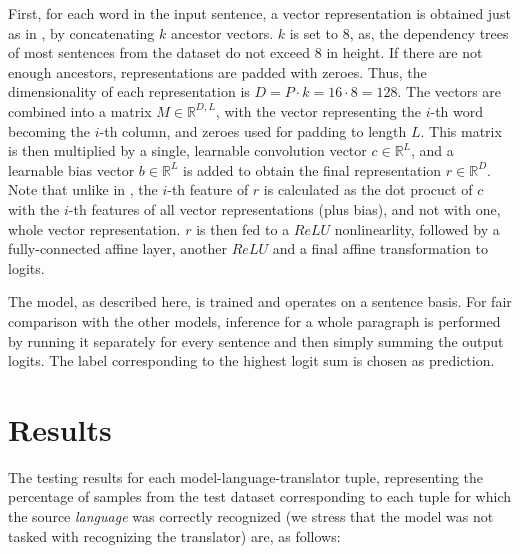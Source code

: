 \documentclass[twocolumn]{article}
\begin{document}
First, for each word in the input sentence, a vector representation is obtained just as in \cite{ancestors}, by concatenating $k$ ancestor vectors. $k$ is set to $8$, as, the dependency trees of most sentences from the dataset do not exceed $8$ in height. If there are not enough ancestors, representations are padded with zeroes. Thus, the dimensionality of each representation is $D=P\cdot k = 16 \cdot 8 = 128$. The vectors are combined into a matrix $M \in \mathbb{R}^{D, L}$, with the vector representing the $i$-th word becoming the $i$-th column, and zeroes used for padding to length $L$. This matrix is then multiplied by a single, learnable convolution vector $c \in \mathbb{R}^{L}$, and a learnable bias vector $b \in \mathbb{R}^{L}$ is added to obtain the final representation $r \in \mathbb{R}^{D}$. Note that unlike in \cite{ancestors}, the $i$-th feature of $r$ is calculated as the dot procuct of $c$ with the $i$-th features of all vector representations (plus bias), and not with one, whole vector representation. $r$ is then fed to a $ReLU$ nonlinearlity, followed by a fully-connected affine layer, another $ReLU$ and a final affine transformation to logits.
 
The model, as described here, is trained and operates on a sentence basis. For fair comparison with the other models, inference for a whole paragraph is performed by running it separately for every sentence and then simply summing the output logits. The label corresponding to the highest logit sum is chosen as prediction.

\section*{Results}

The testing results for each model-language-translator tuple, representing the percentage of samples from the test dataset corresponding to each tuple for which the source \emph{language} was correctly recognized (we stress that the model was not tasked with recognizing the translator) are, as follows:
\end{document}

